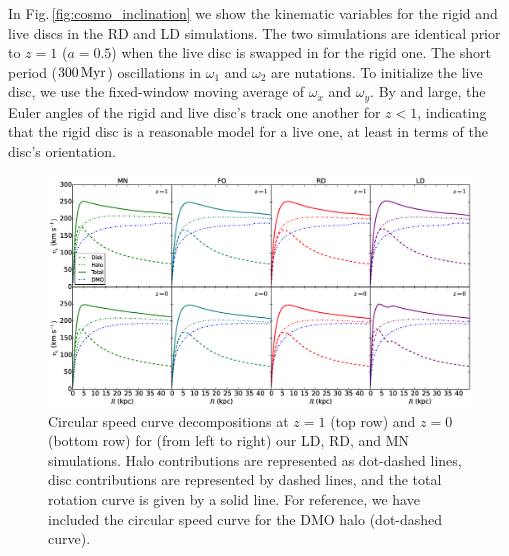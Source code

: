 In Fig.\,\ref{fig:cosmo_inclination} we show the kinematic variables
for the rigid and live discs in the RD and LD simulations.  The two
simulations are identical prior to $z=1$ ($a=0.5$) when the live disc
is swapped in for the rigid one.  The short period ($300\,{\rm Myr}$)
oscillations in $\omega_1$ and $\omega_2$ are nutations.  To
initialize the live disc, we use the fixed-window moving average of $\omega_x$ and
$\omega_y$.  By and large, the Euler angles of the rigid and live
disc's track one another for $z<1$, indicating that the rigid disc
is a reasonable model for a live one, at least in terms of the disc's
orientation.

\begin{figure}
\centering 
\includegraphics[width=1.\textwidth]{../figures/all_rotation_curves_five_sims}
\caption{Circular speed curve decompositions at $z=1$ (top row) and
  $z=0$ (bottom row) for (from left to right) our LD, RD, and MN
  simulations.  Halo contributions are represented as dot-dashed
  lines, disc contributions are represented by dashed lines, and the
  total rotation curve is given by a solid line.  For reference, we have
  included the circular speed curve for the DMO halo (dot-dashed curve).}
\label{fig:rotation_curves}
\end{figure} 

